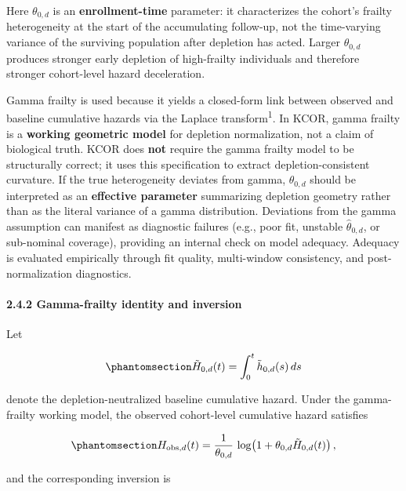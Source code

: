 \documentclass[
]{article}
\begin{document}
Here \(\theta_{0,d}\) is an \textbf{enrollment-time} parameter: it characterizes the cohort's frailty heterogeneity at the start of the accumulating follow-up, not the time-varying variance of the surviving population after depletion has acted. Larger \(\theta_{0,d}\) produces stronger early depletion of high-frailty individuals and therefore stronger cohort-level hazard deceleration.

Gamma frailty is used because it yields a closed-form link between observed and baseline cumulative hazards via the Laplace transform\textsuperscript{1}. In KCOR, gamma frailty is a \textbf{working geometric model} for depletion normalization, not a claim of biological truth. KCOR does \textbf{not} require the gamma frailty model to be structurally correct; it uses this specification to extract depletion-consistent curvature. If the true heterogeneity deviates from gamma, \(\theta_{0,d}\) should be interpreted as an \textbf{effective parameter} summarizing depletion geometry rather than as the literal variance of a gamma distribution. Deviations from the gamma assumption can manifest as diagnostic failures (e.g., poor fit, unstable \(\hat{\theta}_{0,d}\), or sub-nominal coverage), providing an internal check on model adequacy. Adequacy is evaluated empirically through fit quality, multi-window consistency, and post-normalization diagnostics.

\paragraph{2.4.2 Gamma-frailty identity and inversion}\label{gamma-frailty-identity-and-inversion}

Let

\begin{equation}\protect\phantomsection\label{eq:baseline-cumhazard}{\tilde H_{0,d}(t) = \int_0^t \tilde h_{0,d}(s)\,ds}\end{equation}

denote the depletion-neutralized baseline cumulative hazard. Under the gamma-frailty working model, the observed cohort-level cumulative hazard satisfies

\begin{equation}\protect\phantomsection\label{eq:gamma-frailty-identity}{H_{\mathrm{obs},d}(t) = \frac{1}{\theta_{0,d}}\,\log\!\left(1 + \theta_{0,d} \tilde H_{0,d}(t)\right),}\end{equation}

and the corresponding inversion is
\end{document}
